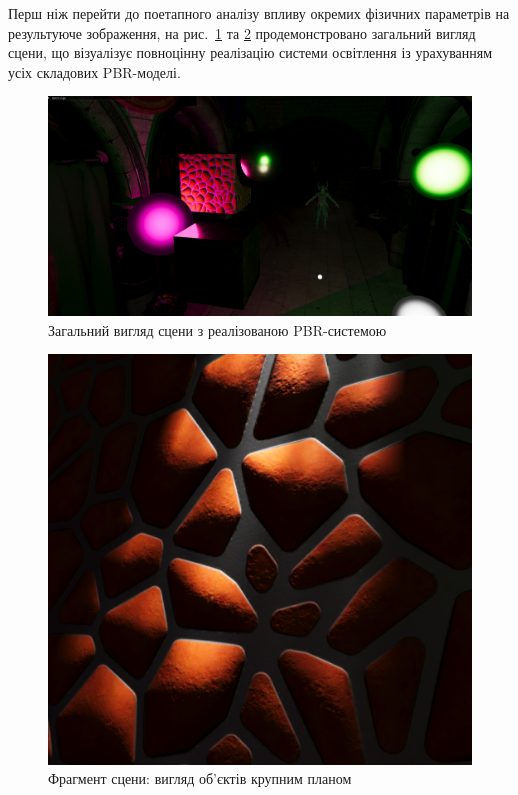 \par Перш ніж перейти до поетапного аналізу впливу окремих фізичних параметрів на результуюче зображення, на рис.~\ref{fig:overview} та \ref{fig:close_overview} продемонстровано загальний вигляд сцени, що візуалізує повноцінну реалізацію системи освітлення із урахуванням усіх складових PBR-моделі.

\begin{figure}[h]
\centering
\includegraphics[scale = 0.2125]{Pictures/1.png}
\caption{Загальний вигляд сцени з реалізованою PBR-системою}
\label{fig:overview}
\end{figure}

\begin{figure}[h]
\centering
\includegraphics[scale = 0.2125]{Pictures/12.png}
\caption{Фрагмент сцени: вигляд об'єктів крупним планом}
\label{fig:close_overview}
\end{figure}

